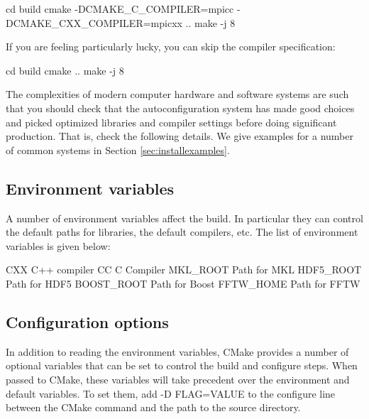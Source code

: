 \begin{shade}
cd build
cmake -DCMAKE_C_COMPILER=mpicc -DCMAKE_CXX_COMPILER=mpicxx ..
make -j 8
\end{shade}

If you are feeling particularly lucky, you can skip the compiler specification:

\begin{shade}
cd build
cmake ..
make -j 8
\end{shade}

The complexities of modern computer hardware and software systems are
such that you should check that the autoconfiguration system has made
good choices and picked optimized libraries and compiler settings
before doing significant production. That is, check the following details. We
give examples for a number of common systems in Section \ref{sec:installexamples}.

\subsection{Environment variables}
\label{sec:envvar}
A number of environment variables affect the build.  In particular
they can control the default paths for libraries, the default
compilers, etc.  The list of environment variables is given below:
%
\begin{shade}
CXX              C++ compiler
CC               C Compiler
MKL_ROOT         Path for MKL
HDF5_ROOT        Path for HDF5
BOOST_ROOT       Path for Boost
FFTW_HOME        Path for FFTW
\end{shade}

\subsection{Configuration options}
\label{sec:cmakeoptions}
In addition to reading the environment variables, CMake provides a
number of optional variables that can be set to control the build and
configure steps.  When passed to CMake, these variables will take
precedent over the environment and default variables.  To set them,
add -D FLAG=VALUE to the configure line between the CMake command and
the path to the source directory.

